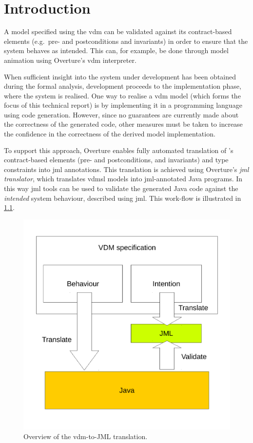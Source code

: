 
\chapter{Introduction}

A model specified using the \ac{vdm} can be validated against its
contract-based elements (e.g.\ pre- and postconditions and invariants)
in order to ensure that the system behaves as intended. This can, for
example, be done through model animation using Overture's \ac{vdm}
interpreter.

When sufficient insight into the system under development has been
obtained during the formal analysis, development proceeds to the
implementation phase, where the system is realised. One way to realise
a \ac{vdm} model (which forms the focus of this technical report) is
by implementing it in a programming language using code
generation. However, since no guarantees are currently made about the
correctness of the generated code, other measures must be taken to
increase the confidence in the correctness of the derived model
implementation.

To support this approach, Overture enables fully automated translation
of \vsl's contract-based elements (pre- and postconditions, and
invariants) and type constraints into \ac{jml} annotations. This
translation is achieved using Overture's \emph{\ac{jml} translator},
which translates \ac{vdmsl} models into \ac{jml}-annotated Java
programs. In this way \ac{jml} tools can be used to validate the
generated Java code against the \emph{intended} system behaviour,
described using \ac{jml}. This work-flow is illustrated in
\cref{fig:vdm2jml-overview}.

\begin{figure}[!ht]
  \centering
  \includegraphics[width=0.6\linewidth]{figs/vdm2jml}
  \caption {Overview of the \ac{vdm}-to-JML translation.}
  \label{fig:vdm2jml-overview}
\end{figure}

